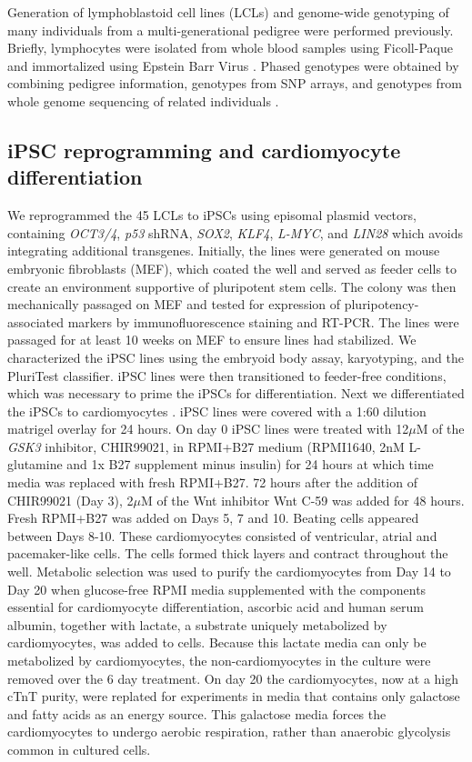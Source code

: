 \documentclass{article}
\begin{document}
Generation of lymphoblastoid cell lines (LCLs) and genome-wide genotyping of
many individuals from a multi-generational pedigree were performed
previously. Briefly, lymphocytes were isolated from whole blood samples using Ficoll-Paque and immortalized using Epstein Barr Virus \cite{Cusanovich2012,
Cusanovich2016}. Phased genotypes were obtained by combining pedigree
information, genotypes from SNP arrays, and genotypes from whole genome
sequencing of related individuals \cite{Livne2015}.

\subsection*{iPSC reprogramming and cardiomyocyte differentiation} 

We reprogrammed the 45 LCLs to iPSCs using episomal plasmid vectors, containing \emph{OCT3/4}, \emph{p53} shRNA, \emph{SOX2}, \emph{KLF4}, \emph{L-MYC}, and \emph{LIN28} which avoids integrating additional transgenes\cite{Okita2011}. Initially, the lines were generated on mouse embryonic fibroblasts (MEF), which coated the well and served as feeder cells to create an environment supportive of pluripotent stem cells.  The colony was then mechanically passaged on MEF and tested for expression of pluripotency-associated markers by immunofluorescence staining and RT-PCR. The lines were passaged for at least 10 weeks on MEF to ensure lines had stabilized. We
characterized the iPSC lines using the embryoid body assay, karyotyping,
and the PluriTest \cite{Muller2011} classifier. 
iPSC lines were then transitioned to feeder-free conditions, which was necessary to prime the iPSCs for differentiation. Next we differentiated
the iPSCs to cardiomyocytes  \cite{Lian2013, Burridge2014}. iPSC lines were covered with a 1:60 dilution matrigel overlay for 24 hours. On day 0 iPSC lines were treated with 12$\mu$M of the \emph{GSK3} inhibitor, CHIR99021, in RPMI+B27 medium (RPMI1640, 2nM L-glutamine and 1x B27 supplement minus insulin) for 24 hours at which time media was replaced with fresh RPMI+B27. 72 hours after the addition of CHIR99021 (Day 3), 2$\mu$M of the Wnt inhibitor Wnt C-59 was added for 48 hours.  Fresh RPMI+B27 was added on Days 5, 7 and 10. Beating cells appeared between Days 8-10. These cardiomyocytes consisted of ventricular, atrial and pacemaker-like cells. The cells formed thick layers and contract throughout the well. Metabolic selection was used to purify the cardiomyocytes\cite{Tohyama2013-hb} from Day 14 to Day 20 when glucose-free RPMI media supplemented with the components essential for cardiomyocyte differentiation\cite{Burridge2014}, ascorbic acid and human serum albumin, together with lactate, a substrate uniquely metabolized by cardiomyocytes, was added to cells. Because this lactate media can only be metabolized by cardiomyocytes, the non-cardiomyocytes in the culture were removed over the 6 day treatment. On day 20 the cardiomyocytes, now at a high cTnT purity, were replated for experiments in media that contains only galactose and fatty acids as an energy source. This galactose media forces the cardiomyocytes to undergo aerobic respiration, rather than anaerobic glycolysis common in cultured cells.
\end{document}
